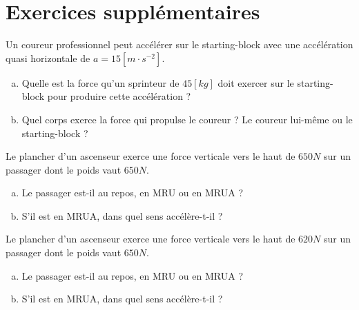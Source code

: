 \section{Exercices supplémentaires}
\begin{exercise}
    Un coureur professionnel peut accélérer sur le starting-block avec une accélération quasi horizontale de \(a=15\unit{[m\cdot s^{-2}]}\).
    \begin{enumerate}[a)]
        \item Quelle est la force qu'un sprinteur de \(45\unit{[kg]}\)  doit exercer sur le starting-block pour produire cette accélération ?
        \item Quel corps exerce la force qui propulse le coureur ? Le coureur lui-même ou le starting-block ?
    \end{enumerate}

\end{exercise}

\begin{exercise}
    Le plancher d'un ascenseur exerce une force verticale vers le haut de \(650 \unit{N}\) sur un passager dont le poids vaut \(650 \unit{N}\).
    \begin{enumerate}[a)]
        \item Le passager est-il au repos, en MRU ou en MRUA ?
        \item S'il est en MRUA, dans quel sens accélère-t-il ?
    \end{enumerate}
\end{exercise}

\begin{exercise}
    Le plancher d'un ascenseur exerce une force verticale vers le haut de \(620 \unit{N}\) sur un passager dont le poids vaut \(650 \unit{N}\).
    \begin{enumerate}[a)]
        \item Le passager est-il au repos, en MRU ou en MRUA ?
        \item S'il est en MRUA, dans quel sens accélère-t-il ?
    \end{enumerate}
\end{exercise}

